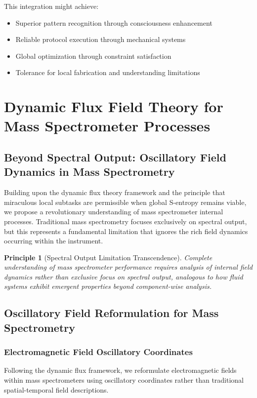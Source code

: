 \documentclass[11pt,a4paper]{article}
\newtheorem{principle}[theorem]{Principle}
\theoremstyle{remark}
\begin{document}
This integration might achieve:
\begin{itemize}
\item Superior pattern recognition through consciousness enhancement
\item Reliable protocol execution through mechanical systems
\item Global optimization through constraint satisfaction
\item Tolerance for local fabrication and understanding limitations
\end{itemize}

\section{Dynamic Flux Field Theory for Mass Spectrometer Processes}

\subsection{Beyond Spectral Output: Oscillatory Field Dynamics in Mass Spectrometry}

Building upon the dynamic flux theory framework and the principle that miraculous local subtasks are permissible when global S-entropy remains viable, we propose a revolutionary understanding of mass spectrometer internal processes. Traditional mass spectrometry focuses exclusively on spectral output, but this represents a fundamental limitation that ignores the rich field dynamics occurring within the instrument.

\begin{principle}[Spectral Output Limitation Transcendence]
Complete understanding of mass spectrometer performance requires analysis of internal field dynamics rather than exclusive focus on spectral output, analogous to how fluid systems exhibit emergent properties beyond component-wise analysis.
\end{principle}

\subsection{Oscillatory Field Reformulation for Mass Spectrometry}

\subsubsection{Electromagnetic Field Oscillatory Coordinates}

Following the dynamic flux framework, we reformulate electromagnetic fields within mass spectrometers using oscillatory coordinates rather than traditional spatial-temporal field descriptions.
\end{document}
